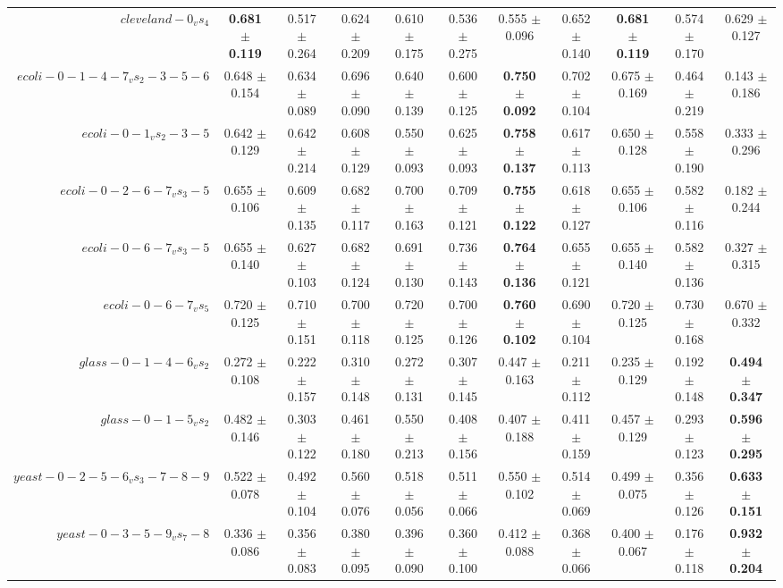 \begin{table}[!ht]
{\begin{tabular}{r c c c c c c c c c c}
$cleveland-0_vs_4$ & \textbf{0.681 $\pm$ 0.119} & 0.517 $\pm$ 0.264 & 0.624 $\pm$ 0.209 & 0.610 $\pm$ 0.175 & 0.536 $\pm$ 0.275 & 0.555 $\pm$ 0.096 & 0.652 $\pm$ 0.140 & \textbf{0.681 $\pm$ 0.119} & 0.574 $\pm$ 0.170 & 0.629 $\pm$ 0.127 \\
$ecoli-0-1-4-7_vs_2-3-5-6$ & 0.648 $\pm$ 0.154 & 0.634 $\pm$ 0.089 & 0.696 $\pm$ 0.090 & 0.640 $\pm$ 0.139 & 0.600 $\pm$ 0.125 & \textbf{0.750 $\pm$ 0.092} & 0.702 $\pm$ 0.104 & 0.675 $\pm$ 0.169 & 0.464 $\pm$ 0.219 & 0.143 $\pm$ 0.186 \\
$ecoli-0-1_vs_2-3-5$ & 0.642 $\pm$ 0.129 & 0.642 $\pm$ 0.214 & 0.608 $\pm$ 0.129 & 0.550 $\pm$ 0.093 & 0.625 $\pm$ 0.093 & \textbf{0.758 $\pm$ 0.137} & 0.617 $\pm$ 0.113 & 0.650 $\pm$ 0.128 & 0.558 $\pm$ 0.190 & 0.333 $\pm$ 0.296 \\
$ecoli-0-2-6-7_vs_3-5$ & 0.655 $\pm$ 0.106 & 0.609 $\pm$ 0.135 & 0.682 $\pm$ 0.117 & 0.700 $\pm$ 0.163 & 0.709 $\pm$ 0.121 & \textbf{0.755 $\pm$ 0.122} & 0.618 $\pm$ 0.127 & 0.655 $\pm$ 0.106 & 0.582 $\pm$ 0.116 & 0.182 $\pm$ 0.244 \\
$ecoli-0-6-7_vs_3-5$ & 0.655 $\pm$ 0.140 & 0.627 $\pm$ 0.103 & 0.682 $\pm$ 0.124 & 0.691 $\pm$ 0.130 & 0.736 $\pm$ 0.143 & \textbf{0.764 $\pm$ 0.136} & 0.655 $\pm$ 0.121 & 0.655 $\pm$ 0.140 & 0.582 $\pm$ 0.136 & 0.327 $\pm$ 0.315 \\
$ecoli-0-6-7_vs_5$ & 0.720 $\pm$ 0.125 & 0.710 $\pm$ 0.151 & 0.700 $\pm$ 0.118 & 0.720 $\pm$ 0.125 & 0.700 $\pm$ 0.126 & \textbf{0.760 $\pm$ 0.102} & 0.690 $\pm$ 0.104 & 0.720 $\pm$ 0.125 & 0.730 $\pm$ 0.168 & 0.670 $\pm$ 0.332 \\
$glass-0-1-4-6_vs_2$ & 0.272 $\pm$ 0.108 & 0.222 $\pm$ 0.157 & 0.310 $\pm$ 0.148 & 0.272 $\pm$ 0.131 & 0.307 $\pm$ 0.145 & 0.447 $\pm$ 0.163 & 0.211 $\pm$ 0.112 & 0.235 $\pm$ 0.129 & 0.192 $\pm$ 0.148 & \textbf{0.494 $\pm$ 0.347} \\
$glass-0-1-5_vs_2$ & 0.482 $\pm$ 0.146 & 0.303 $\pm$ 0.122 & 0.461 $\pm$ 0.180 & 0.550 $\pm$ 0.213 & 0.408 $\pm$ 0.156 & 0.407 $\pm$ 0.188 & 0.411 $\pm$ 0.159 & 0.457 $\pm$ 0.129 & 0.293 $\pm$ 0.123 & \textbf{0.596 $\pm$ 0.295} \\
$yeast-0-2-5-6_vs_3-7-8-9$ & 0.522 $\pm$ 0.078 & 0.492 $\pm$ 0.104 & 0.560 $\pm$ 0.076 & 0.518 $\pm$ 0.056 & 0.511 $\pm$ 0.066 & 0.550 $\pm$ 0.102 & 0.514 $\pm$ 0.069 & 0.499 $\pm$ 0.075 & 0.356 $\pm$ 0.126 & \textbf{0.633 $\pm$ 0.151} \\
$yeast-0-3-5-9_vs_7-8$ & 0.336 $\pm$ 0.086 & 0.356 $\pm$ 0.083 & 0.380 $\pm$ 0.095 & 0.396 $\pm$ 0.090 & 0.360 $\pm$ 0.100 & 0.412 $\pm$ 0.088 & 0.368 $\pm$ 0.066 & 0.400 $\pm$ 0.067 & 0.176 $\pm$ 0.118 & \textbf{0.932 $\pm$ 0.204} \\

\end{tabular}}
\end{table}
